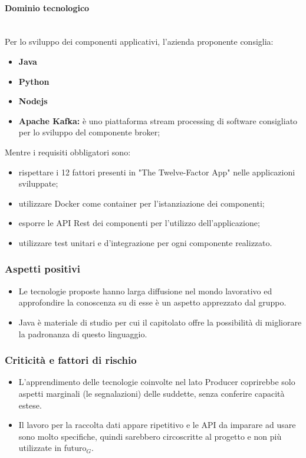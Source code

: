 \paragraph{Dominio tecnologico}\mbox{}\\
Per lo sviluppo dei componenti applicativi, l'azienda proponente consiglia:
\begin{itemize}
	\item \textbf{Java}
	\item \textbf{Python}
	\item \textbf{Nodejs}
	\item \textbf{Apache Kafka:} è uno piattaforma stream processing di software
	 consigliato per lo sviluppo del componente broker;
\end{itemize}
Mentre i requisiti obbligatori sono:
\begin{itemize}
	\item rispettare i 12 fattori presenti in "The Twelve-Factor App" nelle 
	applicazioni sviluppate;
	\item utilizzare Docker come container per l'istanziazione dei componenti;
	\item esporre le API Rest dei componenti per l'utilizzo dell'applicazione; 
	\item utilizzare test unitari e d'integrazione per ogni componente 
	realizzato.
\end{itemize}
\subsubsection{Aspetti positivi}
\begin{itemize}
	\item Le tecnologie proposte hanno larga diffusione nel mondo lavorativo ed
	 approfondire la conoscenza su di esse è un aspetto apprezzato dal gruppo.
	\item Java è materiale di studio per cui il capitolato offre la possibilità di 
	migliorare la padronanza di questo linguaggio.
\end{itemize}
\subsubsection{Criticità e fattori di rischio}
\begin{itemize}
	\item L'apprendimento delle tecnologie coinvolte nel lato 
	Producer coprirebbe solo aspetti marginali (le segnalazioni) delle
	suddette, senza conferire capacità estese. 
	\item Il lavoro per la raccolta dati appare ripetitivo e le
	 API da imparare ad usare sono molto specifiche, quindi sarebbero 
	 circoscritte al progetto e non più utilizzate in futuro$_{G}$. 
	
\end{itemize}

